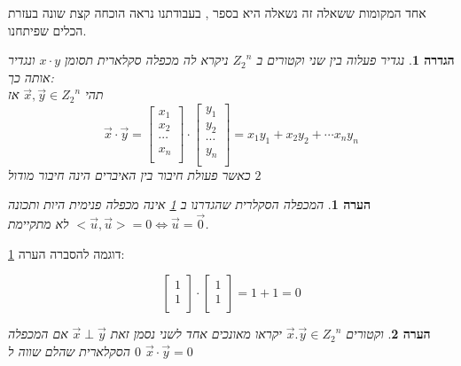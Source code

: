 \documentclass[12pt,twoside]{article}
\newtheorem{definition}{הגדרה}[section]
\newtheorem{comm}{הערה}[section]
\newcommand{\Zn}{{Z_2}^n}
\begin{document}
אחד המקומות ששאלה זה נשאלה היא בספר 
\cite{B3},
בעבודתנו נראה הוכחה קצת שונה בעזרת הכלים שפיתחנו.

\begin{definition}
    \label{def:inner_mul}
    נגדיר פעלוה 
    בין שני וקטורים ב
    $\Zn$
    ניקרא לה מכפלה סקלארית
    תסומן 
    $x \cdot y$
    ונגדיר אותה כך:
    \\
    תהי 
    $\vec{x}, \vec{y} \in \Zn$
    אז 
    \[
        \vec{x} \cdot \vec{y} = 
        \begin{bmatrix}
            x_1 \\
            x_2 \\
            \cdots \\
            x_n \\
        \end{bmatrix}
        \cdot 
        \begin{bmatrix}
            y_1 \\
            y_2 \\
            \cdots \\
            y_n \\
        \end{bmatrix}
        = 
        x_1 y_1 + x_2 y_2 + \cdots x_n y_n
    \]
    כאשר 
    פעולת חיבור בין האיברים 
    הינה 
    חיבור מודול
    $2$
\end{definition}

\begin{comm}
    \label{comm:not_really_inner_mul}
    המכפלה הסקלרית שהגדרנו ב
    \ref{def:inner_mul}
    אינה מכפלה פנימית היות ותכונה 
    $<\vec{u},\vec{u}> = 0 \Leftrightarrow \vec{u} = \vec{0} $
    לא מתקיימת.
\end{comm}

דוגמה 
להסברה הערה
\ref{comm:not_really_inner_mul}:

\[
    \begin{bmatrix}
    1 \\
    1 \\
    \end{bmatrix}    
    \cdot 
    \begin{bmatrix}
    1 \\
    1 \\
    \end{bmatrix} 
    = 1 + 1 = 0
\]

\begin{comm}
    וקטורים 
    $\vec{x}. \vec{y} \in \Zn $
    יקראו מאונכים אחד לשני נסמן זאת 
    $\vec{x} \perp  \vec{y}$
    אם המכפלה הסקלארית שהלם שווה 
    ל
    $0$
    $\vec{x} \cdot \vec{y} = 0$
\end{comm}
\end{document}
